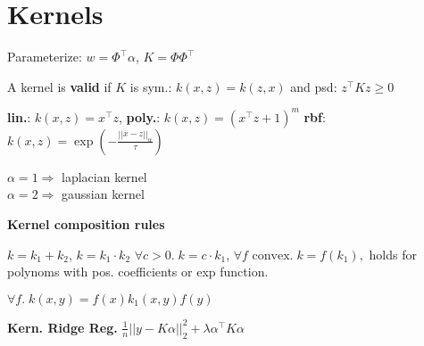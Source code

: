\section*{Kernels}

Parameterize: $w = \Phi^\top \alpha$, $K = \Phi \Phi^\top$

A kernel is \textbf{valid} if $K$ is sym.: $k(x,z) = k(z,x)$ and psd: $z^\top K z \geq 0$

\textbf{lin.}: $k(x, z) = x^\top z$, \textbf{poly.}: $k(x, z) = (x^\top z + 1)^m$
\textbf{rbf}: $k(x, z) = \exp ( -\frac{||x - z||_\alpha}{\tau} )$

$\alpha = 1 \Rightarrow $ laplacian kernel \\
$\alpha = 2 \Rightarrow $ gaussian kernel

\textbf{Kernel composition rules}

$k = k_1 + k_2$, \quad $k = k_1 \cdot k_2$ \quad $\forall c > 0. \; k = c \cdot k_1$,
$\forall f \text{ convex}. \; k = f(k_1), $ holds for polynoms with pos. coefficients or exp function. 

$\forall f. \; k(x,y) = f(x)k_1(x,y)f(y)$

\textbf{Kern. Ridge Reg.}
$\frac{1}{n} ||y - K\alpha ||_2^2 + \lambda \alpha^\top K \alpha$
